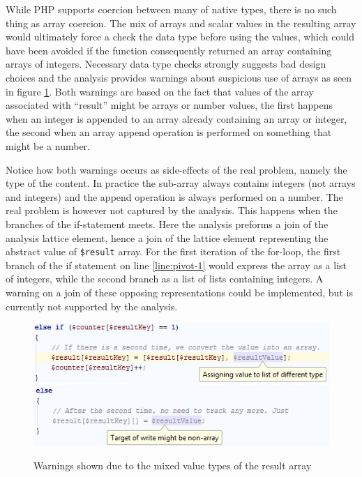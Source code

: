 While PHP supports coercion between many of native types, there is no such thing as array coercion. The mix of arrays and scalar values in the resulting array would ultimately force a check the data type before using the values, which could have been avoided if the function consequently returned an array containing arrays of integers. Necessary data type checks strongly suggests bad design choices and the analysis provides warnings about suspicious use of arrays as seen in figure \ref{fig:pivotScreenshot}. Both warnings are based on the fact that values of the array associated with ``result'' might be arrays or number values, the first happens when an integer is appended to an array already containing an array or integer, the second when an array append operation is performed on something that might be a number. 

Notice how both warnings occurs as side-effects of the real problem, namely the type of the content. In practice the sub-array always contains integers (not arrays and integers) and the append operation is always performed on a number. The real problem is however not captured by the analysis. This happens when the branches of the if-statement meets. Here the analysis preforms a join of the analysis lattice element, hence a join of the lattice element representing the abstract value of \texttt{\$result} array. For the first iteration of the for-loop, the first branch of the if statement on line \ref{line:pivot-1} would express the array as a list of integers, while the second branch as a list of lists containing integers. A warning on a join of these opposing representations could be implemented, but is currently not supported by the analysis.



\begin{figure}[htbp]
\centering
\includegraphics[scale=0.6]{chapters/caseStudy/pivotWarning1}
\includegraphics[scale=0.6]{chapters/caseStudy/pivotWarning2}
\caption{Warnings shown due to the mixed value types of the result array}
\label{fig:pivotScreenshot}
\end{figure}

